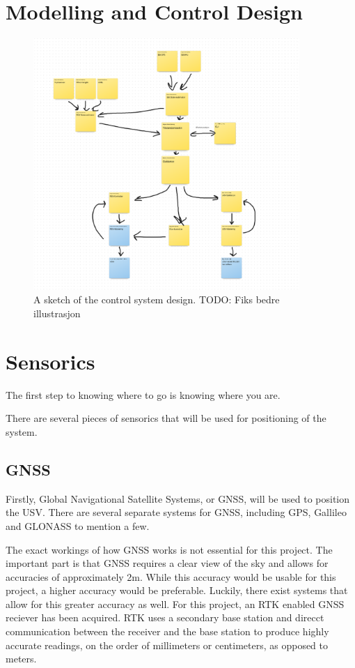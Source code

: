 \documentclass[class=article, crop=false, draft=true]{standalone}
\begin{document}
\section{Modelling and Control Design}

\begin{figure}
    \centering
    \includegraphics[width=0.9\textwidth]{control-system}
    \caption{A sketch of the control system design. TODO: Fiks bedre illustrasjon}
    \label{fig:control-system}
\end{figure}

\section{Sensorics}
The first step to knowing where to go is knowing where you are.

There are several pieces of sensorics that will be used for positioning of the system.

\subsection{GNSS}
Firstly, Global Navigational Satellite Systems, or GNSS, will be used to position the USV. There are several separate systems for GNSS, including GPS, Gallileo and GLONASS to mention a few.

The exact workings of how GNSS works is not essential for this project. The important part is that GNSS requires a clear view of the sky and allows for accuracies of approximately 2m. While this accuracy would be usable for this project, a higher accuracy would be preferable. Luckily, there exist systems that allow for this greater accuracy as well. For this project, an RTK enabled GNSS reciever has been acquired. RTK uses a secondary base station and direcct communication between the receiver and the base station to produce highly accurate readings, on the order of millimeters or centimeters, as opposed to meters.
\end{document}
